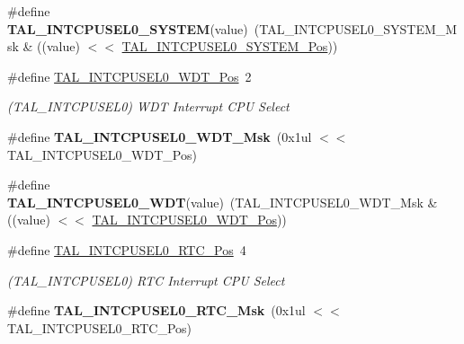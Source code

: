 \begin{DoxyCompactItemize}
\item 
\hypertarget{group___s_a_m_l21___t_a_l_gaf896b20c43040059fc7b3da3c7bc92b2}{}\#define {\bfseries T\+A\+L\+\_\+\+I\+N\+T\+C\+P\+U\+S\+E\+L0\+\_\+\+S\+Y\+S\+T\+E\+M}(value)~(T\+A\+L\+\_\+\+I\+N\+T\+C\+P\+U\+S\+E\+L0\+\_\+\+S\+Y\+S\+T\+E\+M\+\_\+\+Msk \& ((value) $<$$<$ \hyperlink{group___s_a_m_l21___t_a_l_gaf651f619e5357ce5deb5d1349f0ecb4e}{T\+A\+L\+\_\+\+I\+N\+T\+C\+P\+U\+S\+E\+L0\+\_\+\+S\+Y\+S\+T\+E\+M\+\_\+\+Pos}))\label{group___s_a_m_l21___t_a_l_gaf896b20c43040059fc7b3da3c7bc92b2}

\item 
\hypertarget{group___s_a_m_l21___t_a_l_ga56c7bbfef2893304112fc175f7ce4af7}{}\#define \hyperlink{group___s_a_m_l21___t_a_l_ga56c7bbfef2893304112fc175f7ce4af7}{T\+A\+L\+\_\+\+I\+N\+T\+C\+P\+U\+S\+E\+L0\+\_\+\+W\+D\+T\+\_\+\+Pos}~2\label{group___s_a_m_l21___t_a_l_ga56c7bbfef2893304112fc175f7ce4af7}

\begin{DoxyCompactList}\small\item\em (T\+A\+L\+\_\+\+I\+N\+T\+C\+P\+U\+S\+E\+L0) W\+D\+T Interrupt C\+P\+U Select \end{DoxyCompactList}\item 
\hypertarget{group___s_a_m_l21___t_a_l_ga005df3438db0408139970f5928d89018}{}\#define {\bfseries T\+A\+L\+\_\+\+I\+N\+T\+C\+P\+U\+S\+E\+L0\+\_\+\+W\+D\+T\+\_\+\+Msk}~(0x1ul $<$$<$ T\+A\+L\+\_\+\+I\+N\+T\+C\+P\+U\+S\+E\+L0\+\_\+\+W\+D\+T\+\_\+\+Pos)\label{group___s_a_m_l21___t_a_l_ga005df3438db0408139970f5928d89018}

\item 
\hypertarget{group___s_a_m_l21___t_a_l_ga3ad8ef9dbaea1227ca9924b84f4f41ee}{}\#define {\bfseries T\+A\+L\+\_\+\+I\+N\+T\+C\+P\+U\+S\+E\+L0\+\_\+\+W\+D\+T}(value)~(T\+A\+L\+\_\+\+I\+N\+T\+C\+P\+U\+S\+E\+L0\+\_\+\+W\+D\+T\+\_\+\+Msk \& ((value) $<$$<$ \hyperlink{group___s_a_m_l21___t_a_l_ga56c7bbfef2893304112fc175f7ce4af7}{T\+A\+L\+\_\+\+I\+N\+T\+C\+P\+U\+S\+E\+L0\+\_\+\+W\+D\+T\+\_\+\+Pos}))\label{group___s_a_m_l21___t_a_l_ga3ad8ef9dbaea1227ca9924b84f4f41ee}

\item 
\hypertarget{group___s_a_m_l21___t_a_l_ga5b800db846e6c6f837d8411ecbad64b5}{}\#define \hyperlink{group___s_a_m_l21___t_a_l_ga5b800db846e6c6f837d8411ecbad64b5}{T\+A\+L\+\_\+\+I\+N\+T\+C\+P\+U\+S\+E\+L0\+\_\+\+R\+T\+C\+\_\+\+Pos}~4\label{group___s_a_m_l21___t_a_l_ga5b800db846e6c6f837d8411ecbad64b5}

\begin{DoxyCompactList}\small\item\em (T\+A\+L\+\_\+\+I\+N\+T\+C\+P\+U\+S\+E\+L0) R\+T\+C Interrupt C\+P\+U Select \end{DoxyCompactList}\item 
\hypertarget{group___s_a_m_l21___t_a_l_ga7582181f03a12f92613473f2308ae528}{}\#define {\bfseries T\+A\+L\+\_\+\+I\+N\+T\+C\+P\+U\+S\+E\+L0\+\_\+\+R\+T\+C\+\_\+\+Msk}~(0x1ul $<$$<$ T\+A\+L\+\_\+\+I\+N\+T\+C\+P\+U\+S\+E\+L0\+\_\+\+R\+T\+C\+\_\+\+Pos)\label{group___s_a_m_l21___t_a_l_ga7582181f03a12f92613473f2308ae528}


\end{DoxyCompactItemize}
